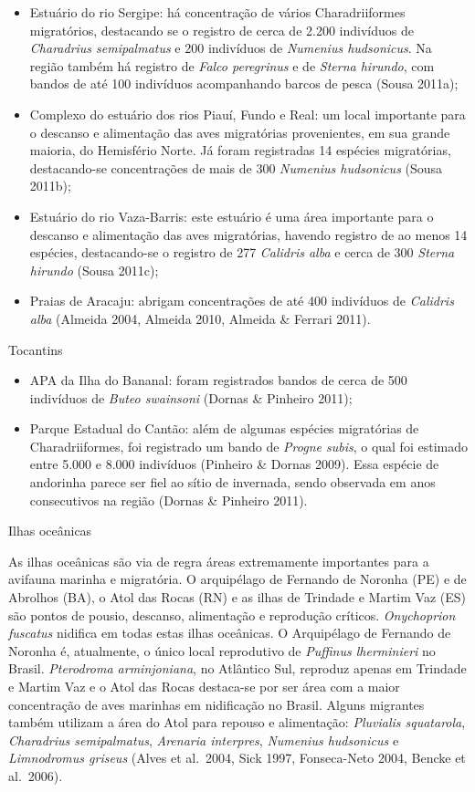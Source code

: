 \documentclass[
  oneside]{scrbook}
\begin{document}
\begin{itemize}
\item
  Estuário do rio Sergipe: há concentração de vários Charadriiformes migratórios, destacando se o registro de cerca de 2.200 indivíduos de \emph{Charadrius semipalmatus} e 200 indivíduos de \emph{Numenius hudsonicus}. Na região também há registro de \emph{Falco peregrinus} e de \emph{Sterna hirundo}, com bandos de até 100 indivíduos acompanhando barcos de pesca (Sousa 2011a);
\item
  Complexo do estuário dos rios Piauí, Fundo e Real: um local importante para o descanso e alimentação das aves migratórias provenientes, em sua grande maioria, do Hemisfério Norte. Já foram registradas 14 espécies migratórias, destacando-se concentrações de mais de 300 \emph{Numenius hudsonicus} (Sousa 2011b);
\item
  Estuário do rio Vaza-Barris: este estuário é uma área importante para o descanso e alimentação das aves migratórias, havendo registro de ao menos 14 espécies, destacando-se o registro de 277 \emph{Calidris alba} e cerca de 300 \emph{Sterna hirundo} (Sousa 2011c);
\item
  Praias de Aracaju: abrigam concentrações de até 400 indivíduos de \emph{Calidris alba} (Almeida 2004, Almeida 2010, Almeida \& Ferrari 2011).
\end{itemize}

Tocantins

\begin{itemize}
\item
  APA da Ilha do Bananal: foram registrados bandos de cerca de 500 indivíduos de \emph{Buteo swainsoni} (Dornas \& Pinheiro 2011);
\item
  Parque Estadual do Cantão: além de algumas espécies migratórias de Charadriiformes, foi registrado um bando de \emph{Progne subis}, o qual foi estimado entre 5.000 e 8.000 indivíduos (Pinheiro \& Dornas 2009). Essa espécie de andorinha parece ser fiel ao sítio de invernada, sendo observada em anos consecutivos na região (Dornas \& Pinheiro 2011).
\end{itemize}

Ilhas oceânicas

As ilhas oceânicas são via de regra áreas extremamente importantes para a avifauna marinha e migratória. O arquipélago de Fernando de Noronha (PE) e de Abrolhos (BA), o Atol das Rocas (RN) e as ilhas de Trindade e Martim Vaz (ES) são pontos de pousio, descanso, alimentação e reprodução críticos. \emph{Onychoprion fuscatus} nidifica em todas estas ilhas oceânicas. O Arquipélago de Fernando de Noronha é, atualmente, o único local reprodutivo de \emph{Puffinus lherminieri} no Brasil. \emph{Pterodroma arminjoniana}, no Atlântico Sul, reproduz apenas em Trindade e Martim Vaz e o Atol das Rocas destaca-se por ser área com a maior concentração de aves marinhas em nidificação no Brasil. Alguns migrantes também utilizam a área do Atol para repouso e alimentação: \emph{Pluvialis squatarola}, \emph{Charadrius semipalmatus}, \emph{Arenaria interpres}, \emph{Numenius hudsonicus} e \emph{Limnodromus griseus} (Alves et al.~2004, Sick 1997, Fonseca-Neto 2004, Bencke et al.~2006).
\end{document}

